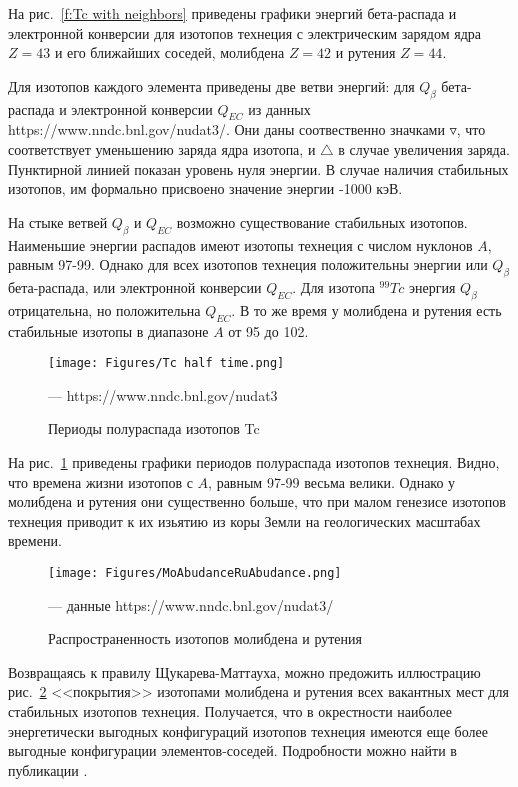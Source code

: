 \documentclass[a5paper,openany]{book}
\begin{document}
На рис.~\ref{f:Tc with neighbors} приведены графики энергий бета-распада и электронной конверсии для изотопов технеция с электрическим зарядом ядра $Z=43$ и его ближайших соседей, молибдена  $Z=42$ и рутения  $Z=44$.

Для изотопов каждого элемента приведены две ветви энергий: для  $Q_{\beta}$ бета-распада и электронной конверсии $Q_{EC}$ из данных https://www.nndc.bnl.gov/nudat3/. Они даны соотвественно значками $\triangledown$, что соответствует уменьшению заряда ядра изотопа, и $\triangle$ в случае увеличения заряда. Пунктирной линией показан уровень нуля энергии. В случае наличия стабильных изотопов, им формально присвоено значение энергии -1000 кэВ. 

На стыке ветвей $Q_{\beta}$  и $Q_{EC}$ возможно существование стабильных изотопов.
Наименьшие энергии распадов имеют изотопы технеция с числом нуклонов $A$, равным 97-99.
Однако для всех изотопов технеция положительны энергии или $Q_{\beta}$ бета-распада, или электронной конверсии $Q_{EC}$. 
Для изотопа $^{99}Tc$ энергия $Q_{\beta}$  отрицательна, но положительна $Q_{EC}$.
В то же время у  молибдена и рутения есть стабильные изотопы в диапазоне $A$ от 95 до 102. 

\begin{figure}[ht] 
	\centering\small
	\unitlength=1mm
	\texttt{[image: Figures/Tc half time.png]} 
	\caption{Периоды полураспада изотопов Tc} --- https://www.nndc.bnl.gov/nudat3 
	\label{f:Tc half time}
\end{figure}

На рис.~\ref{f:Tc half time} приведены графики периодов полураспада изотопов технеция. Видно, что времена жизни изотопов с $A$, равным 97-99 весьма велики. Однако у молибдена и рутения они существенно больше, что при малом генезисе изотопов технеция приводит к их изьятию из коры Земли на геологических масштабах времени.

\begin{figure}[ht] 
	\centering\small
	\unitlength=1mm
	\texttt{[image: Figures/MoAbudanceRuAbudance.png]} 
	\caption{Распространенность изотопов молибдена и рутения} --- данные https://www.nndc.bnl.gov/nudat3/
	\label{f:MoAbudanceRuAbudance}
\end{figure}

Возвращаясь к правилу Щукарева-Маттауха, можно предожить иллюстрацию рис.~\ref{f:MoAbudanceRuAbudance} <<покрытия>> изотопами молибдена и рутения всех вакантных мест для стабильных изотопов технеция. Получается, что в окрестности наиболее энергетически выгодных конфигураций изотопов технеция имеются еще более выгодные конфигурации элементов-соседей.
Подробности можно найти в публикации \cite{Technetium2017}.
\end{document}
